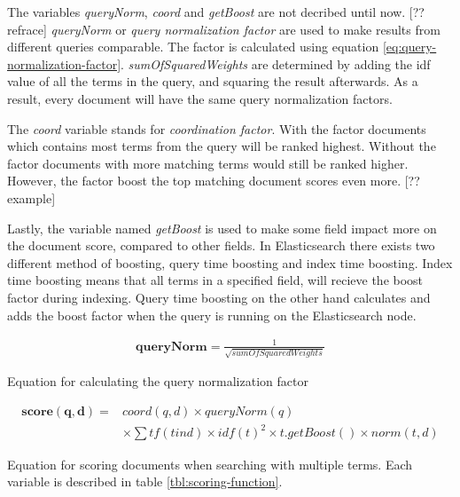 The variables \textit{queryNorm}, \textit{coord} and \textit{getBoost} are not decribed until now. [?? refrace]
\textit{queryNorm} or \textit{query normalization factor} are used to make results from different queries comparable.
The factor is calculated using equation \ref{eq:query-normalization-factor}.
\textit{sumOfSquaredWeights} are determined by adding the idf value of all the terms in the query,
and squaring the result afterwards.
As a result, every document will have the same query normalization factors.

The \textit{coord} variable stands for \textit{coordination factor}.
With the factor documents which contains most terms from the query will be ranked highest.
Without the factor documents with more matching terms would still be ranked higher.
However, the factor boost the top matching document scores even more.
[?? example]

Lastly, the variable named \textit{getBoost} is used to make some field impact more on the document score,
compared to other fields.
In Elasticsearch there exists two different method of boosting, query time boosting and index time boosting.
Index time boosting means that all terms in a specified field, will recieve the boost factor during indexing.
Query time boosting on the other hand calculates and adds the boost factor when the query is running on the Elasticsearch node.

\begin{cequation}
	\begin{equation}
		\begin{aligned}
			\mathbf{queryNorm} = \frac{1}{\sqrt{sumOfSquaredWeights}}
		\end{aligned}
	\end{equation}
	\caption{Equation for calculating the query normalization factor}
  \label{eq:query-normalization-factor}
\end{cequation}

\begin{cequation}
	\begin{equation}
		\begin{aligned}
			\mathbf{score(q,d)} = & coord(q,d) \times queryNorm(q) \\
														& \times \sum tf(t in d) \times idf(t)^2 \times t.getBoost() \times norm(t,d)
		\end{aligned}
	\end{equation}
	\caption{Equation for scoring documents when searching with multiple terms. Each variable is described in table \ref{tbl:scoring-function}.}
  \label{eq:scoring-function}
\end{cequation}

